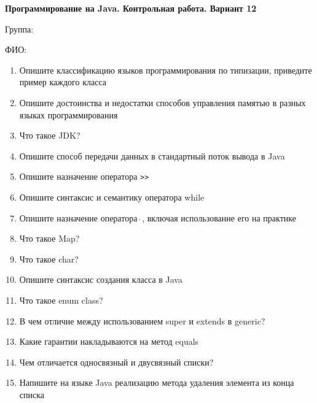 \documentclass[12pt]{article}
\begin{document}
\newpage\begin{minipage}{\textwidth}
\textbf{Программирование на Java. Контрольная работа. Вариант 12}

Группа: \underline{\hspace{3cm}}

ФИО: \underline{\hspace{10cm}}

\begin{enumerate}
\item Опишите классификацию языков программирования по типизации, приведите пример каждого класса
\item Опишите достоинства и недостатки способов управления памятью в разных языках программирования
\item Что такое JDK?
\item Опишите способ передачи данных в стандартный поток вывода в Java
\item Опишите назначение оператора \verb|>>|
\item Опишите синтаксис и семантику оператора while
\item Опишите назначение оператора $\hat{\ }$, включая использование его на практике
\item Что такое Map?
\item Что такое char?
\item Опишите синтаксис создания класса в Java
\item Что такое enum class?
\item В чем отличие между использованием super и extends в generic?
\item Какие гарантии накладываются на метод equals
\item Чем отличается односвязный и двусвязный списки?
\item Напишите на языке Java реализацию метода удаления элемента из конца списка

\end{enumerate}
\end{minipage}
\end{document}
